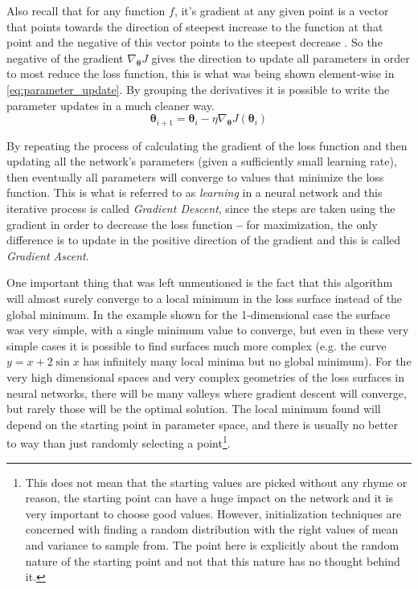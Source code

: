 Also recall that for any function $f$, it's gradient at any given point is a vector that points towards the direction of steepest increase to the function at that point and the negative of this vector points to the steepest decrease \cite[Chapter~4.6]{calculusIII2016}. So the negative of the gradient $\nabla_{\bm{\theta}} J$ gives the direction to update all parameters in order to most reduce the loss function, this is what was being shown element-wise in \autoref{eq:parameter_update}. By grouping the derivatives it is possible to write the parameter updates in a much cleaner way.
\begin{equation} \label{eq:gradient_descent}
    \bm{\theta}_{i+1} = \bm{\theta}_{i} - \eta \nabla_{\bm{\theta}} J(\bm{\theta}_i)
\end{equation}

By repeating the process of calculating the gradient of the loss function and then updating all the network's parameters (given a sufficiently small learning rate), then eventually all parameters will converge to values that minimize the loss function. This is what is referred to as \textit{learning} in a neural network and this iterative process is called \textit{Gradient Descent}, since the steps are taken using the gradient in order to decrease the loss function \textbf{--} for maximization, the only difference is to update in the positive direction of the gradient and this is called \textit{Gradient Ascent}.

One important thing that was left unmentioned is the fact that this algorithm will almost surely converge to a local minimum in the loss surface instead of the global minimum. In the example shown for the 1-dimensional case the surface was very simple, with a single minimum value to converge, but even in these very simple cases it is possible to find surfaces much more complex (e.g. the curve $y = x + 2\sin x$ has infinitely many local minima but no global minimum). For the very high dimensional spaces and very complex geometries of the loss surfaces in neural networks, there will be many valleys where gradient descent will converge, but rarely those will be the optimal solution. The local minimum found will depend on the starting point in parameter space, and there is usually no better to way than just randomly selecting a point\footnote{
    This does not mean that the starting values are picked without any rhyme or reason, the starting point can have a huge impact on the network and it is very important to choose good values. However, initialization techniques are concerned with finding a random distribution with the right values of mean and variance to sample from. The point here is explicitly about the random nature of the starting point and not that this nature has no thought behind it.
}.


